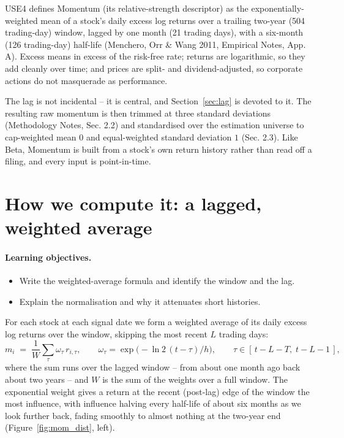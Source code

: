 \documentclass[11pt]{article}
\theoremstyle{definition}
\theoremstyle{plain}
\theoremstyle{remark}
\begin{document}
USE4 defines Momentum (its relative-strength descriptor) as the exponentially-weighted mean of a stock's daily excess log returns over a trailing two-year (504 trading-day) window, lagged by one month (21 trading days), with a six-month (126 trading-day) half-life (Menchero, Orr \& Wang 2011, Empirical Notes, App. A). Excess means in excess of the risk-free rate; returns are logarithmic, so they add cleanly over time; and prices are split- and dividend-adjusted, so corporate actions do not masquerade as performance.

The lag is not incidental -- it is central, and Section~\ref{sec:lag} is devoted to it. The resulting raw momentum is then trimmed at three standard deviations (Methodology Notes, Sec. 2.2) and standardised over the estimation universe to cap-weighted mean $0$ and equal-weighted standard deviation $1$ (Sec. 2.3). Like Beta, Momentum is built from a stock's own return history rather than read off a filing, and every input is point-in-time.

\section{How we compute it: a lagged, weighted average}\label{sec:compute}

\paragraph{Learning objectives.}
\begin{itemize}[leftmargin=1.4em,topsep=2pt]
  \item Write the weighted-average formula and identify the window and the lag.
  \item Explain the normalisation and why it attenuates short histories.
\end{itemize}

For each stock at each signal date we form a weighted average of its daily excess log returns over the window, skipping the most recent $L$ trading days:
\[
m_i \;=\; \frac{1}{W}\sum_{\tau} \omega_\tau\, r_{i,\tau},
\qquad
\omega_\tau = \exp\!\big(-\ln 2\,(t-\tau)/h\big),
\qquad
\tau \in [\,t-L-T,\; t-L-1\,],
\]
where the sum runs over the lagged window -- from about one month ago back about two years -- and $W$ is the sum of the weights over a full window. The exponential weight gives a return at the recent (post-lag) edge of the window the most influence, with influence halving every half-life of about six months as we look further back, fading smoothly to almost nothing at the two-year end (Figure~\ref{fig:mom_dist}, left).
\end{document}
